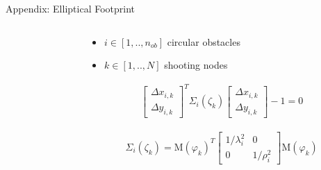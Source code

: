 \documentclass[10pt,aspectratio=1610]{beamer} %
\begin{document}
\begin{frame}{Appendix: Elliptical Footprint}
	\begin{columns}[onlytextwidth]
		\begin{column}{0.45\textwidth}
			\begin{center}
			\def\svgwidth{1.1\textwidth}
			
			\end{center}
		\end{column}

		\begin{column}{0.45\textwidth}
			\begin{itemize}[label=\textbullet]
				\item ${i} \in [1, .., n_{ob}]$ circular obstacles
				\item ${k} \in [1, .., N]$ shooting nodes
			\end{itemize}
		\begin{align*}
			\begin{bmatrix}
				\Delta x_{i, k}\\
				\Delta y_{i, k}
			\end{bmatrix}^T
			\Sigma_{i}(\zeta_{k})
			\begin{bmatrix}
				\Delta x_{i, k}\\
				\Delta y_{i, k}
			\end{bmatrix} - 1 = 0
		\end{align*}

		\begin{align*}\Sigma_{i}(\zeta_{k}) =     
			\mathrm{M}(\varphi_{k})^T
			\begin{bmatrix}
				1/\lambda^{2}_{i} & 0\\
				0 & 1/\rho^{2}_{i}
			\end{bmatrix}
			\mathrm{M}(\varphi_{k})
		\end{align*}
		\end{column}
	\end{columns}
\end{frame}
\end{document}
